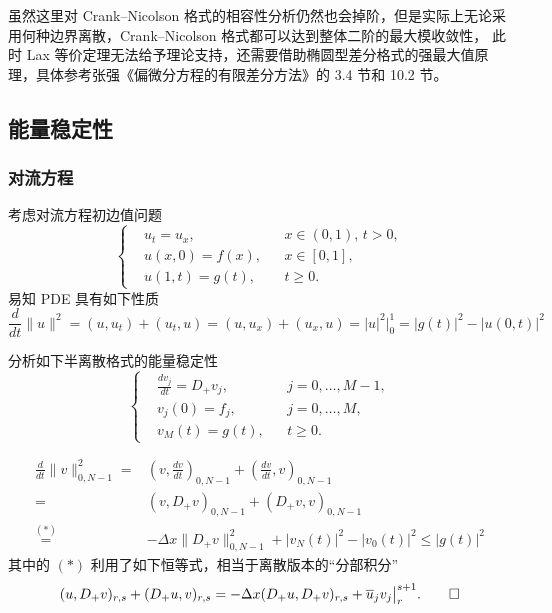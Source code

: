 \begin{remark}
    虽然这里对 Crank–Nicolson 格式的相容性分析仍然也会掉阶，但是实际上无论采用何种边界离散，Crank–Nicolson 格式都可以达到整体二阶的最大模收敛性，
    此时 Lax 等价定理无法给予理论支持，还需要借助椭圆型差分格式的强最大值原理，具体参考张强《偏微分方程的有限差分方法》的 3.4 节和 10.2 节。
\end{remark}


\subsection{能量稳定性}

\subsubsection{对流方程}

考虑对流方程初边值问题
\[
    \left\{
    \begin{aligned}
         & u_t = u_{x},   &  & x \in (0,1),\, t > 0, \\
         & u(x,0) = f(x), &  & x \in [0,1],          \\
         & u(1,t) = g(t), &  & t \ge 0.
    \end{aligned}
    \right.
\]
易知 PDE 具有如下性质
\[
    \frac{d}{dt}\|u\|^2 = (u,u_t) + (u_t,u) = (u,u_x) + (u_x,u)
    = |u|^2 \big|_0^1 = |g(t)|^2 - |u(0,t)|^2
\]

\begin{example}
    分析如下半离散格式的能量稳定性
    \[
        \left\{
        \begin{aligned}
             & \frac{d v_j}{d t} = D_+ v_j, &  & j=0,\dots,M-1, \\
             & v_j(0) = f_j,                &  & j=0,\dots,M,   \\
             & v_M(t) = g(t),               &  & t \ge 0.
        \end{aligned}
        \right.
    \]
\end{example}

\begin{solution*}
    \begin{align*}
        \frac{d}{dt} \|v\|_{0,N-1}^2
        ={}                & \left( v,\frac{d v}{d t} \right)_{0,N-1} + \left( \frac{d v}{d t}, v\right)_{0,N-1} \\
        ={}                & \left( v,D_+ v \right)_{0,N-1} + \left( D_+ v, v\right)_{0,N-1}                     \\
        \overset{(*)}{=}{} & - \Delta x \|D_+ v\|_{0,N-1}^2 + |v_N(t)|^2 - |v_0(t)|^2 \le{}  |g(t)|^2
    \end{align*}
    其中的 $(*)$ 利用了如下恒等式，相当于离散版本的“分部积分”
    \[
        (u,D_+ v)_{r,s} + (D_+ u, v)_{r,s} = -\Delta x (D_+ u, D_+ v)_{r,s} + \overline{u}_j v_j \big|_r^{s+1}. \qedhere
    \]
\end{solution*}

